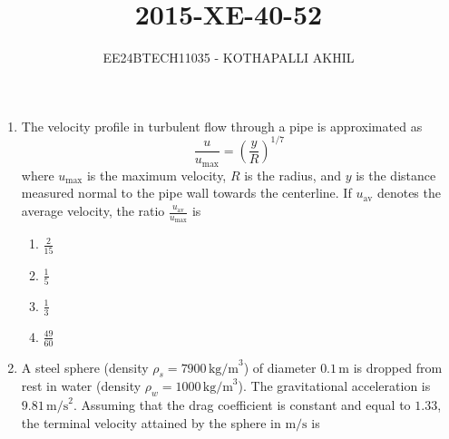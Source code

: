 \documentclass[article]{IEEEtran}
\numberwithin{figure}{enumi}
\begin{document}


\title{2015-XE-40-52}
\author{EE24BTECH11035 - KOTHAPALLI AKHIL}
{\let\newpage\relax\maketitle}

\begin{enumerate}
\item The velocity profile in turbulent flow through a pipe is approximated as
    \begin{equation*}
    \frac{u}{u_{\text{max}}} = \left(\frac{y}{R}\right)^{1/7}
    \end{equation*}
    where $u_{\text{max}}$ is the maximum velocity, $R$ is the radius, and $y$ is the distance measured normal to the pipe wall towards the centerline. If $u_{\text{av}}$ denotes the average velocity, the ratio $\frac{u_{\text{av}}}{u_{\text{max}}}$ is
    \begin{enumerate}
        \item $\frac{2}{15}$\\
        \item $\frac{1}{5}$\\
        \item $\frac{1}{3}$\\
        \item $\frac{49}{60}$
    \end{enumerate}

\item A steel sphere (density $\rho_s = 7900 \, \text{kg/m}^3$) of diameter $0.1 \, \text{m}$ is dropped from rest in water (density $\rho_w = 1000 \, \text{kg/m}^3$). The gravitational acceleration is $9.81 \, \text{m/s}^2$. Assuming that the drag coefficient is constant and equal to $1.33$, the terminal velocity attained by the sphere in $\text{m/s}$ is \underline{\hspace{2cm}}
    

\end{enumerate}
\end{document}
